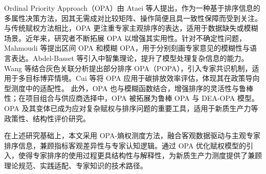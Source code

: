 \documentclass[nonblindrev]{write_paper}
\begin{document}
Ordinal Priority Approach（OPA）由 Ataei 等人提出\citep{ataeiOrdinalPriorityApproach2020}，作为一种基于排序信息的多属性决策方法，因其无需成对比较矩阵、操作简便且具一致性保障而受到关注。与传统赋权方法相比，OPA 更注重专家主观排序的表达，适用于数据缺失或模糊场景。近年来，研究者不断拓展 OPA 以增强其实用性。针对不确定性问题，Mahmoudi 等提出区间 OPA \citep{mahmoudi2023intervalopa}和模糊 OPA\citep{mahmoudi2022fuzzyopa}，用于分别刻画专家意见的模糊性与语言表达。Abdel-Basset 等引入中智集理论，提升了模型处理复杂信息的能力\citep{abdelbasset2022opa}。Wang 等结合灰色关联分析提出部分排序 OPA（POPA），引入专家共识机制，适用于多目标博弈情境\citep{wang2024popa}。Cui 等将 OPA 应用于碳排放效率评估，体现其在政策导向型测度中的适配性\citep{cui2025carbonopa}。
此外，OPA 也与模糊函数结合，增强排序的灵活性与鲁棒性\citep{pamucar2023opa,pamucar2022raaopa}；在项目组合与供应商选择中，OPA 被拓展为鲁棒 OPA \citep{mahmoudi2022ropa}与 DEA-OPA 模型\citep{mahmoudi2022deaopa}。
OPA 及其变体已成为应对复杂赋权与排序问题的重要工具，适用于新质生产力等政策性、结构性评价研究。

在上述研究基础上，本文采用 OPA-熵权测度方法，融合客观数据驱动与主观专家排序信息，兼顾指标客观差异性与专家认知逻辑。通过 OPA 优化赋权模型的引入，使得专家排序的使用过程更具结构性与解释性，为新质生产力测度提供了兼顾理论规范、实践适配、专家知识的技术路径。
\end{document}
